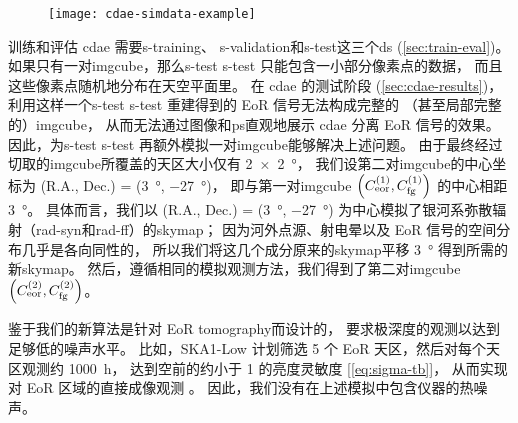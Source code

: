 \begin{figure}[htp]
  \centering
  \texttt{[image: cdae-simdata-example]}
  \label{fig:cdae-simdata}
\end{figure}

训练和评估 \ac{cdae} 需要\acl{s-training}、
\acl{s-validation}和\acl{s-test}这三个\ac{ds} (\autoref{sec:train-eval})。
如果只有一对\ac{imgcube}，那么\acl{s-test} \ac{s-test} 只能包含一小部分像素点的数据，
而且这些像素点随机地分布在天空平面里。
在 \ac{cdae} 的测试阶段 (\autoref{sec:cdae-results})，
利用这样一个\acl{s-test} \ac{s-test} 重建得到的 EoR 信号无法构成完整的
（甚至局部完整的）\ac{imgcube}，
从而无法通过图像和\ac{ps}直观地展示 \ac{cdae} 分离 EoR 信号的效果。
因此，为\acl{s-test} \ac{s-test} 再额外模拟一对\ac{imgcube}能够解决上述问题。
由于最终经过切取的\ac{imgcube}所覆盖的天区大小仅有 \SI{2 x 2}{\degree}，
我们设第二对\ac{imgcube}的中心坐标为
(R.A., Dec.\@) = (\SI{3}{\degree}, \SI{-27}{\degree})，
即与第一对\ac{imgcube}
$\left( C_{\mathrm{eor}}^{(1)}, C_{\mathrm{fg}}^{(1)} \right)$
的中心相距 \SI{3}{\degree}。
具体而言，我们以 (R.A., Dec.\@) = (\SI{3}{\degree}, \SI{-27}{\degree})
为中心模拟了银河系弥散辐射（\ac{rad-syn}和\ac{rad-ff}）的\ac{skymap}；
因为河外点源、射电晕以及 EoR 信号的空间分布几乎是各向同性的，
所以我们将这几个成分原来的\ac{skymap}平移 \SI{3}{\degree} 得到所需的新\ac{skymap}。
然后，遵循相同的模拟观测方法，我们得到了第二对\ac{imgcube}
$\left( C_{\mathrm{eor}}^{(2)}, C_{\mathrm{fg}}^{(2)} \right)$。

鉴于我们的新算法是针对 EoR \ac{tomography}而设计的，
要求极深度的观测以达到足够低的噪声水平。
比如，SKA1-Low 计划筛选 5 个 EoR 天区，然后对每个天区观测约 \SI{1000}{\hour}，
达到空前的约小于 \SI{1}{\mK} 的亮度灵敏度 [\autoref{eq:sigma-tb}]，
从而实现对 EoR 区域的直接成像观测 \cite{mellema2013,mellema2015,koopmans2015}。
因此，我们没有在上述模拟中包含仪器的热噪声。

